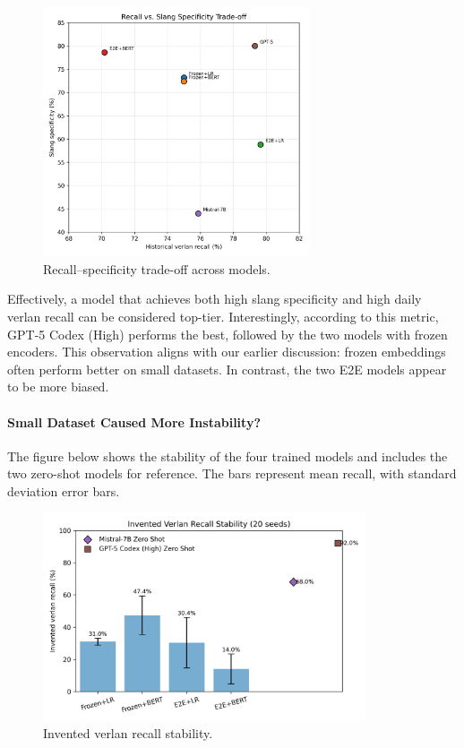 \documentclass[12pt]{article}
\begin{document}
\begin{figure}[H]
    \centering
    \includegraphics[width=0.7\textwidth]{figures/historical_vs_slang_tradeoff.png}
    \caption{Recall--specificity trade-off across models.}
    \label{fig:tradeoff-scatter}
\end{figure}

Effectively, a model that achieves both high slang specificity and high daily verlan recall can be considered top-tier. 
Interestingly, according to this metric, GPT-5 Codex (High) performs the best, followed by the two models with frozen encoders. 
This observation aligns with our earlier discussion: frozen embeddings often perform better on small datasets. 
In contrast, the two E2E models appear to be more biased.

\paragraph{Small Dataset Caused More Instability?}

The figure below shows the stability of the four trained models and includes the two zero-shot models for reference. 
The bars represent mean recall, with standard deviation error bars.

\begin{figure}[H]
    \centering
    \includegraphics[width=0.85\textwidth]{figures/invented_recall_variance.png}
    \caption{Invented verlan recall stability.}
    \label{fig:invented-variance}
\end{figure}
\end{document}
